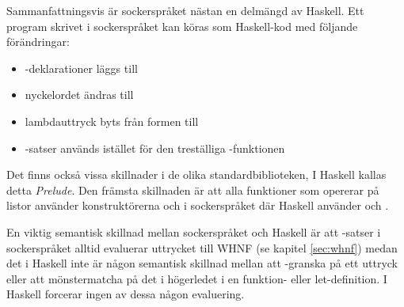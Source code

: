 \documentclass[Rapport]{subfiles}
\begin{document}
Sammanfattningsvis är sockerspråket nästan en delmängd av Haskell. Ett program
skrivet i sockerspråket kan köras som Haskell-kod med följande förändringar:
\begin{itemize}
    \item {}-deklarationer läggs till
    \item nyckelordet  ändras till 
    \item lambdauttryck byts från formen  till 
    \item {}-satser används 
          istället för den treställiga -funktionen 
\end{itemize}
Det finns också vissa skillnader i de olika standardbiblioteken, I Haskell 
kallas detta \emph{Prelude}.
Den främsta skillnaden är att alla funktioner som opererar på listor använder 
konstruktörerna  och  i sockerspråket
där Haskell använder \ic{(:)} och \ic{[]}.

    En viktig semantisk skillnad mellan sockerspråket och Haskell är att
-satser i sockerspråket alltid evaluerar uttrycket till WHNF (se
kapitel \ref{sec:whnf}) medan det i Haskell inte är någon semantisk skillnad mellan att
-granska på ett uttryck eller att mönstermatcha på det i högerledet
i en funktion- eller let-definition. I Haskell forcerar ingen av dessa någon
evaluering. 

\end{document}
